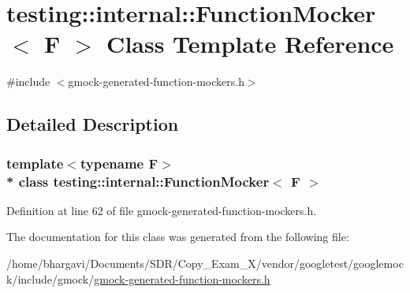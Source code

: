 \hypertarget{classtesting_1_1internal_1_1_function_mocker}{}\section{testing\+:\+:internal\+:\+:Function\+Mocker$<$ F $>$ Class Template Reference}
\label{classtesting_1_1internal_1_1_function_mocker}


{\ttfamily \#include $<$gmock-\/generated-\/function-\/mockers.\+h$>$}



\subsection{Detailed Description}
\subsubsection*{template$<$typename F$>$\\*
class testing\+::internal\+::\+Function\+Mocker$<$ F $>$}



Definition at line 62 of file gmock-\/generated-\/function-\/mockers.\+h.



The documentation for this class was generated from the following file\+:\begin{DoxyCompactItemize}
\item 
/home/bhargavi/\+Documents/\+S\+D\+R/\+Copy\+\_\+\+Exam\+\_\+X/vendor/googletest/googlemock/include/gmock/\hyperlink{gmock-generated-function-mockers_8h}{gmock-\/generated-\/function-\/mockers.\+h}\end{DoxyCompactItemize}
